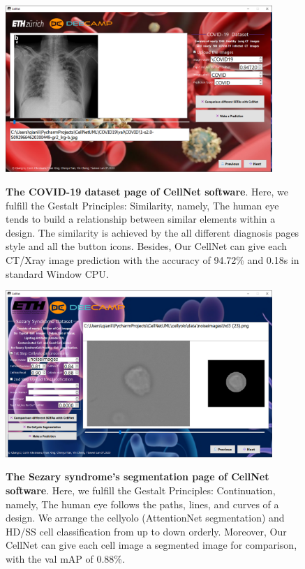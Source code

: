 \begin{figure}[t]
\begin{center}
\includegraphics[height=0.3\textheight,width=0.9\textwidth]{thesis-template-master/images/cellnet4-3page.PNG}
\label{fig:cellnet}
\end{center}
\caption{ \textbf{The COVID-19 dataset page of CellNet software}. Here, we fulfill the Gestalt Principles: Similarity, namely, The human eye tends to build a relationship between similar elements within a design. The similarity is achieved by the all different diagnosis pages style and all the button icons. Besides, Our CellNet can give each CT/Xray image prediction with the accuracy of 94.72\% and 0.18s in standard Window CPU.}
\end{figure}


\begin{figure}[t]
\begin{center}
\includegraphics[height=0.3\textheight,width=0.9\textwidth]{thesis-template-master/images/cellnet5-1page.PNG}
\label{fig:cellnet}
\end{center}
\caption{ \textbf{The Sezary syndrome's segmentation page of CellNet software}. Here, we fulfill the Gestalt Principles: Continuation, namely, The human eye follows the paths, lines, and curves of a design. We arrange the cellyolo (AttentionNet segmentation) and HD/SS cell classification from up to down orderly. Moreover, Our CellNet can give each cell image a segmented image for comparison, with the val mAP of 0.88\%.}
\end{figure}


